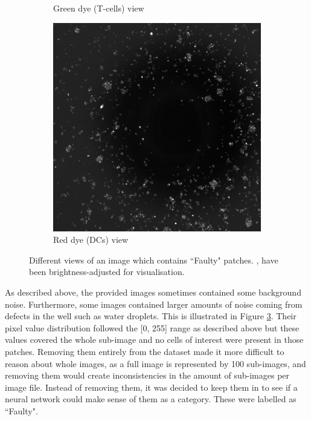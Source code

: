 \begin{figure}[h]
\begin{subfigure}[h!]{0.3\textwidth}
        \caption{Green dye (T-cells) view}
        \label{subfig:tcell}
    \end{subfigure}
    \begin{subfigure}[h!]{0.3\textwidth}
        \includegraphics[width=\textwidth]{dissertation/figures/faulty_dcell.jpg}
        \caption{Red dye (DCs) view}
        \label{subfig:dc}
    \end{subfigure}
    \caption{Different views of an image which contains ``Faulty" patches. \protect{}, \protect{} have been brightness-adjusted for visualisation.}
    \label{fig:noisyimage}
\end{figure}
As described above, the provided images sometimes contained some background noise. Furthermore, some images contained larger amounts of noise coming from defects in the well such as water droplets. This is illustrated in Figure \ref{fig:noisyimage}. Their pixel value distribution followed the [0, 255] range as described above but these values covered the whole sub-image and no cells of interest were present in those patches. Removing them entirely from the dataset made it more difficult to reason about whole images, as a full image is represented by 100 sub-images, and removing them would create inconsistencies in the amount of sub-images per image file. Instead of removing them, it was decided to keep them in to see if a neural network could make sense of them as a category. These were labelled as ``Faulty". 

